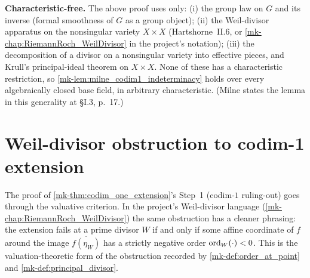 \begin{remark}
  \label{mk-rmk:milne_lem33_charfree}
  \textbf{Characteristic-free.} The above proof uses only: (i) the group law on \(G\)
  and its inverse (formal smoothness of \(G\) as a group object); (ii) the Weil-divisor
  apparatus on the nonsingular variety \(X \times X\) (Hartshorne~II.6, or
  \ref{mk-chap:RiemannRoch_WeilDivisor} in the project's notation); (iii) the
  decomposition of a divisor on a nonsingular variety into effective pieces, and
  Krull's principal-ideal theorem on \(X \times X\). None of these has a characteristic
  restriction, so \ref{mk-lem:milne_codim1_indeterminacy} holds over every
  algebraically closed base field, in arbitrary characteristic. (Milne states the
  lemma in this generality at \S I.3, p.~17.)
\end{remark}

\section{Weil-divisor obstruction to codim-1 extension}
\label{mk-sec:weil_obstruction}

The proof of \ref{mk-thm:codim_one_extension}'s Step~1 (codim-\(1\) ruling-out) goes
through the valuative criterion. In the project's Weil-divisor language
(\ref{mk-chap:RiemannRoch_WeilDivisor}) the same obstruction has a cleaner phrasing:
the extension fails at a prime divisor \(W\) if and only if some affine coordinate of
\(f\) around the image \(\overline{f(\eta_W)}\) has a strictly negative order
\(\operatorname{ord}_W(\cdot) < 0\). This is the valuation-theoretic form of the obstruction
recorded by \ref{mk-def:order_at_point} and \ref{mk-def:principal_divisor}.

